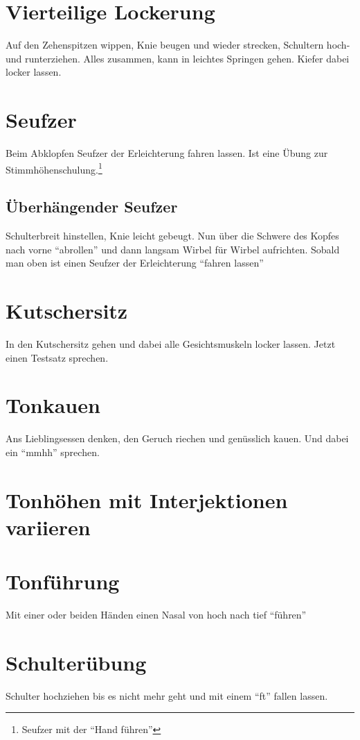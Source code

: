 \documentclass[ngerman, a4paper, twoside]{scrbook}%
\begin{document}
	 \section{Vierteilige Lockerung}
	 Auf den Zehenspitzen wippen, Knie beugen und wieder strecken, Schultern hoch- und runterziehen. Alles zusammen, kann in leichtes Springen gehen. Kiefer dabei locker lassen.

	 \section{Seufzer}
	 Beim Abklopfen Seufzer der Erleichterung fahren lassen. Ist eine Übung zur Stimmhöhenschulung.\footnote{Seufzer mit der "`Hand führen"'}

		\subsection{Überhängender Seufzer}
		Schulterbreit hinstellen, Knie leicht gebeugt. Nun über die Schwere des Kopfes nach vorne "`abrollen"' und dann langsam Wirbel für Wirbel aufrichten. Sobald man oben ist einen Seufzer der Erleichterung "`fahren lassen"'

	\section{Kutschersitz}
	In den Kutschersitz gehen und dabei alle Gesichtsmuskeln locker lassen. Jetzt einen Testsatz sprechen.

	\section{Tonkauen}
	Ans Lieblingsessen denken, den Geruch riechen und genüsslich kauen. Und dabei ein "`mmhh"' sprechen.

	\section{Tonhöhen mit Interjektionen variieren}

	\section{Tonführung}
	Mit einer oder beiden Händen einen Nasal von hoch nach tief "`führen"'

	\section{Schulterübung}
	Schulter hochziehen bis es nicht mehr geht und mit einem "`ft"' fallen lassen.
\end{document}
